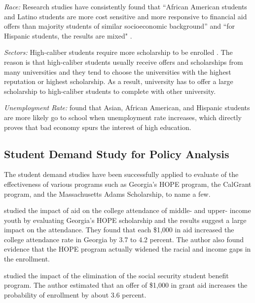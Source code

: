 \documentclass[12pt,english]{report}
\begin{document}
\vspace{0.15in}
\noindent \textit{Race:}  Research studies have consistently found that ``African American 
students and Latino students are more cost sensitive and more responsive to financial aid 
offers than majority students of similar
socioeconomic background''  and ``for Hispanic students, the results are mixed" 
\citet{Hossler1989}.

\vspace{0.15in}
\noindent \textit{Sectors:} High-caliber students require more scholarship to be 
enrolled \citep{chapman1987college}. The reason is that high-caliber students usually 
receive offers and scholarships from many universities and they tend to choose the 
universities with the highest reputation or highest scholarship. As a result, university
has to offer a large scholarship to high-caliber students to complete with other university.



\vspace{0.25in}
\noindent \textit{Unemployment Rate:} \citet{Heller1999} found that Asian, African American,
and Hispanic students are more likely go to school when unemployment rate increases, which 
directly proves that bad economy spurs the interest of high education.


\subsection{Student Demand Study for Policy Analysis }

The student demand studies have been successfully applied to evaluate of the effectiveness of 
various programs such as Georgia's HOPE program, the CalGrant program,  and the Massachusetts 
Adams Scholarship, to name a few.

\citet{Dynarski2000} studied the impact of aid on the college attendance of middle- and upper-
income youth by evaluating Georgia's HOPE scholarship and the results suggest a large impact on 
the attendance. They found that each \$1,000 in aid increased the college attendance 
rate in Georgia by 3.7  to 4.2 percent. The author also found evidence that the HOPE program
actually widened the racial and income gaps in the enrollment.


\citet{Dynarski2003} studied the impact of the elimination of the social security student benefit 
program. The author estimated that an offer of \$1,000 in grant aid increases the probability of  
enrollment by about 3.6 percent.
\end{document}
